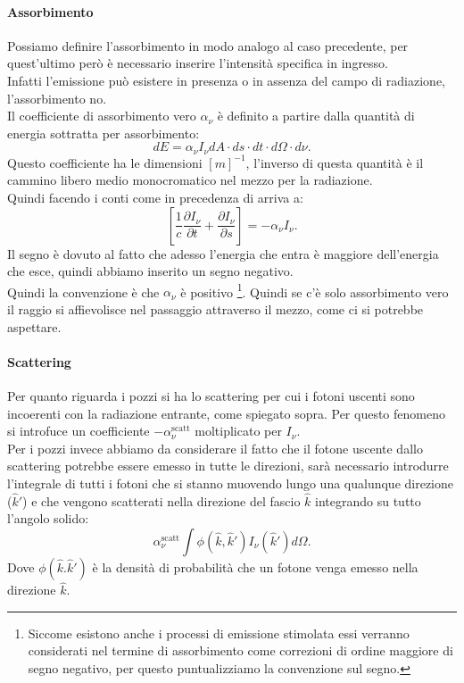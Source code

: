 \paragraph{Assorbimento}%
Possiamo definire l'assorbimento in modo analogo al caso precedente, per quest'ultimo però è necessario inserire l'intensità specifica in ingresso.\\
Infatti l'emissione può esistere in presenza o in assenza del campo di radiazione, l'assorbimento no.\\
Il coefficiente di assorbimento vero $\alpha_{\nu}$ è definito a partire dalla quantità di energia sottratta per assorbimento:
\[
	dE = \alpha_{\nu} I_{\nu} dA \cdot ds\cdot dt\cdot d\Omega\cdot d\nu
.\] 
Questo coefficiente ha le dimensioni $\left[ m \right]^{-1}$, l'inverso di questa quantità è il cammino libero medio monocromatico nel mezzo per la radiazione.
\\Quindi facendo i conti come in precedenza di arriva a:
\[
	\left[ \frac{1}{c}\frac{\partial I_{\nu}}{\partial t} + \frac{\partial I_{\nu}}{\partial s}  \right] = -\alpha_{\nu} I_{\nu}
.\] 
Il segno è dovuto al fatto che adesso l'energia che entra è maggiore dell'energia che esce, quindi abbiamo inserito un segno negativo.\\
Quindi la convenzione è che $\alpha_{\nu}$ è positivo \footnote{Siccome esistono anche i processi di emissione stimolata essi verranno considerati nel termine di assorbimento come correzioni di ordine maggiore di segno negativo, per questo puntualizziamo la convenzione sul segno.}. Quindi se c'è solo assorbimento vero il raggio si affievolisce nel passaggio attraverso il mezzo, come ci si potrebbe aspettare.
\paragraph{Scattering}%
Per quanto riguarda i pozzi si ha lo scattering per cui i fotoni uscenti sono incoerenti con la radiazione entrante, come spiegato sopra. Per questo fenomeno si introfuce un coefficiente $-\alpha_{\nu}^{\text{scatt}}$ moltiplicato per $I_{\nu}$.\\
Per i pozzi invece abbiamo da considerare il fatto che il fotone uscente dallo scattering potrebbe essere emesso in tutte le direzioni, sarà necessario introdurre l'integrale di tutti i fotoni che si stanno muovendo lungo una qualunque direzione ($\hat{k}'$) e che vengono scatterati nella direzione del fascio $\hat{k}$ integrando su tutto l'angolo solido:
 \[
	 \alpha_{\nu}^{\text{scatt}}\int\phi\left( \hat{k},\hat{k}' \right) I_{\nu}\left( \hat{k}' \right) d\Omega
.\] 
Dove $\phi\left( \hat{k}.\hat{k}' \right)$ è la densità di probabilità che un fotone venga emesso nella direzione $\hat{k}$.
